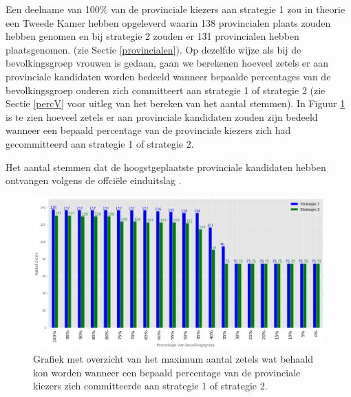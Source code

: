 Een deelname van 100\% van de provinciale kiezers aan strategie 1 zou in theorie een Tweede Kamer hebben opgeleverd waarin 138 provincialen plaats zouden hebben genomen en bij strategie 2 zouden er 131 provincialen hebben plaatsgenomen. (zie Sectie \ref{provincialen}).  Op dezelfde wijze als bij de bevolkingsgroep vrouwen is gedaan, gaan we berekenen hoeveel zetels er aan provinciale kandidaten worden bedeeld wanneer bepaalde percentages van de bevolkingsgroep ouderen zich committeert aan strategie 1 of strategie 2 (zie Sectie \ref{percV} voor uitleg van het bereken van het aantal stemmen). In Figuur \ref{fig:PerP} is te zien hoeveel zetels er aan provinciale kandidaten zouden zijn bedeeld wanneer een bepaald percentage van de provinciale kiezers zich had gecommitteerd aan strategie 1 of strategie 2.


\begin{table}[H]
\centering
	\begin{footnotesize}
		
	\end{footnotesize}
			\caption{Het aantal stemmen dat de hoogstgeplaatste provinciale kandidaten hebben ontvangen volgens de offci\"{e}le einduitslag \citep{Kiesraad_uitslag}.}
\label{table:HoogstP} 
\end{table}





\begin{figure}[H]


	\includegraphics[width=\linewidth]{percentages_van_provincialenS1S2.png}

			\caption{Grafiek met overzicht van het maximum aantal zetels wat behaald kon worden wanneer een bepaald percentage van de provinciale kiezers zich committeerde aan strategie 1 of strategie 2.}

\label{fig:PerP}
\end{figure}

